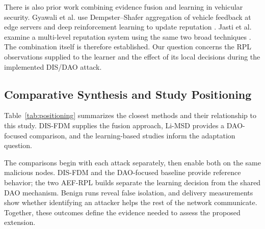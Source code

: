\documentclass[journal]{IEEEtran}
\begin{document}
There is also prior work combining evidence fusion and learning in vehicular security. Gyawali et al. use Dempster--Shafer aggregation of vehicle feedback at edge servers and deep reinforcement learning to update reputation \cite{gyawali2021}. Jasti et al. examine a multi-level reputation system using the same two broad techniques \cite{jasti2024}. The combination itself is therefore established. Our question concerns the RPL observations supplied to the learner and the effect of its local decisions during the implemented DIS/DAO attack.

\subsection{Comparative Synthesis and Study Positioning}
Table~\ref{tab:positioning} summarizes the closest methods and their relationship to this study. DIS-FDM supplies the fusion approach, Li-MSD provides a DAO-focused comparison, and the learning-based studies inform the adaptation question.

The comparisons begin with each attack separately, then enable both on the same malicious nodes. DIS-FDM and the DAO-focused baseline provide reference behavior; the two AEF-RPL builds separate the learning decision from the shared DAO mechanism. Benign runs reveal false isolation, and delivery measurements show whether identifying an attacker helps the rest of the network communicate. Together, these outcomes define the evidence needed to assess the proposed extension.
\end{document}
